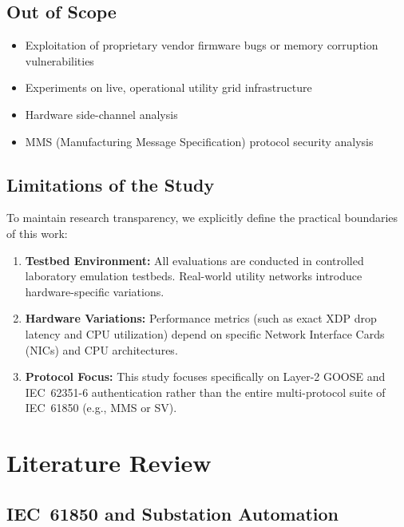 \documentclass[12pt,a4paper]{article}
\begin{document}
\subsection{Out of Scope}

\begin{itemize}[noitemsep]
  \item Exploitation of proprietary vendor firmware bugs or memory corruption vulnerabilities
  \item Experiments on live, operational utility grid infrastructure
  \item Hardware side-channel analysis
  \item MMS (Manufacturing Message Specification) protocol security analysis
\end{itemize}

\subsection{Limitations of the Study}

To maintain research transparency, we explicitly define the practical boundaries of this work:
\begin{enumerate}[noitemsep]
  \item \textbf{Testbed Environment:} All evaluations are conducted in controlled laboratory emulation testbeds. Real-world utility networks introduce hardware-specific variations.
  \item \textbf{Hardware Variations:} Performance metrics (such as exact XDP drop latency and CPU utilization) depend on specific Network Interface Cards (NICs) and CPU architectures.
  \item \textbf{Protocol Focus:} This study focuses specifically on Layer-2 GOOSE and IEC~62351-6 authentication rather than the entire multi-protocol suite of IEC~61850 (e.g., MMS or SV).
\end{enumerate}

\section{Literature Review}

\subsection{IEC~61850 and Substation Automation}
\end{document}

